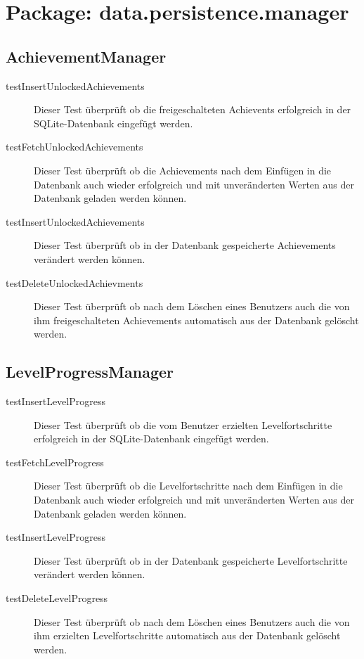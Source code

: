 \section{Package: data.persistence.manager}

\subsection{AchievementManager}

\begin{description}

\item[testInsertUnlockedAchievements]
Dieser Test überprüft ob die freigeschalteten Achievents erfolgreich in der SQLite-Datenbank eingefügt werden. 

\item[testFetchUnlockedAchievements]
Dieser Test überprüft ob die Achievements nach dem Einfügen in die Datenbank auch wieder erfolgreich und mit unveränderten Werten aus der Datenbank geladen werden können.

\item[testInsertUnlockedAchievements]
Dieser Test überprüft ob in der Datenbank gespeicherte Achievements verändert werden können.

\item[testDeleteUnlockedAchievments]
Dieser Test überprüft ob nach dem Löschen eines Benutzers auch die von ihm freigeschalteten Achievements automatisch aus der Datenbank gelöscht werden.

\end{description}

\subsection{LevelProgressManager}

\begin{description}

\item[testInsertLevelProgress]
Dieser Test überprüft ob die vom Benutzer erzielten Levelfortschritte erfolgreich in der SQLite-Datenbank eingefügt werden. 

\item[testFetchLevelProgress]
Dieser Test überprüft ob die Levelfortschritte nach dem Einfügen in die Datenbank auch wieder erfolgreich und mit unveränderten Werten aus der Datenbank geladen werden können.

\item[testInsertLevelProgress]
Dieser Test überprüft ob in der Datenbank gespeicherte Levelfortschritte verändert werden können.

\item[testDeleteLevelProgress]
Dieser Test überprüft ob nach dem Löschen eines Benutzers auch die von ihm erzielten Levelfortschritte automatisch aus der Datenbank gelöscht werden.

\end{description}

